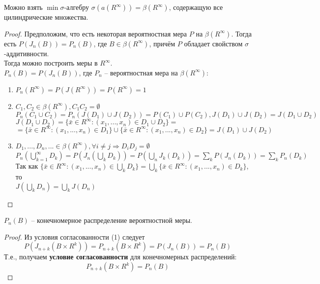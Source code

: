 \begin{proposition}
Можно взять $\min \sigma$-алгебру $\sigma(a(R^\infty))=\beta (R^\infty)$, содержащую все цилиндрические множества.
\end{proposition}
\begin{proof}
Предположим, что есть некоторая вероятностная мера $P$ на $\beta (R^\infty)$. Тогда есть $P(J_n(B)) = P_n(B)$, где $B\in \beta(R^\infty)$, причём $P$ обладает свойством $\sigma$-аддитивности.\\
Тогда можно построить меры в $R^\infty$.\\
$P_n(B)=P(J_n(B))$, где $P_n$ -- вероятностная мера на $\beta (R^\infty)$:
\begin{enumerate}
\item $P_n(R^\infty) = P(J(R^\infty)) = P(R^\infty)=1$
\item $C_1,C_2\in \beta (R^\infty), C_1 C_2 = \emptyset$\\
$P_n(C_1\cup C_2)=P_n(J(D_1)\cup J(D_2))=P(C_1)\cup P(C_2), J(D_1)\cup J(D_2) = J(D_1\cup D_2)$\\
$J(D_1\cup D_2)=\{\bar{x}\in R^\infty : (x_1,...,x_n)\in D_1 \cup D_2 \}=$\\
$=\{\bar{x}\in R^\infty : (x_1,...,x_n)\in D_1\}\cup \{\bar{x}\in R^\infty : (x_1,...,x_n)\in D_2 \}=J(D_1)\cup J(D_2)$
\item $D_1,...,D_n,...\in \beta (R^\infty), \forall i \ne j \Rightarrow D_i D_j = \emptyset$\\
$P_n(\bigcup\limits_{k=1}^\infty D_k)=P(J_n(\bigcup\limits_k D_k))=P(\bigcup\limits_n J_k(D_k))=\sum\limits_k P(J_n(D_k))=\sum\limits_k P_n(D_k)$\\
Так как $\{\bar{x}\in R^\infty:(x_1,...,x_n)\in \bigcup\limits_k D_k\}=\bigcup\limits_k\{\bar{x}\in R^\infty:(x_1,...,x_n)\in D_k\}$, то\\
$J(\bigcup\limits_k D_n)=\bigcup\limits_k J(D_n)$
\end{enumerate}
\end{proof}
\begin{proposition}
$P_n(B)$ -- конечномерное распределение вероятностной меры.
\end{proposition}
\begin{proof}
Из условия согласованности (1) следует
$$P(J_{n+k}(B\times R^k))=P_{n+k}(B\times R^k)=P(J_n(B))=P_n(B)$$
Т.е., получаем \textbf{условие согласованности} для конечномерных распределений:
\begin{equation}
P_{n+k}(B\times R^k)=P_n(B)
\end{equation}
\end{proof}
